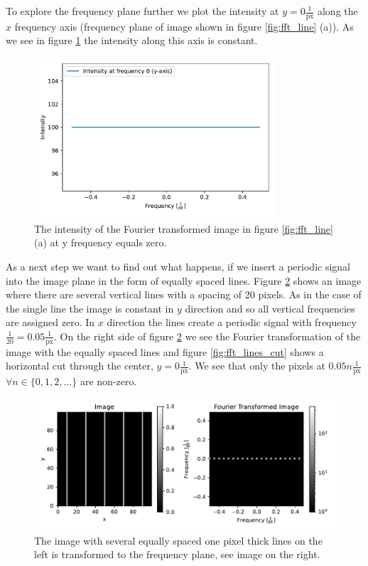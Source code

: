 To explore the frequency plane further we plot the intensity at $y=0 \frac{1}{\mathrm{px}}$ along the $x$ frequency axis (frequency plane of image shown in figure \ref{fig:fft_line} (a)). As we see in figure \ref{fig:fft_line_cut} the intensity along this axis is constant.
\begin{figure}[H]
	\centering
		\includegraphics[width=0.8\textwidth]{pics/fft_simulation_cutoneline.pdf}
		\caption{The intensity of the Fourier transformed image in figure \ref{fig:fft_line} (a) at y frequency equals zero.}
		\label{fig:fft_line_cut}
\end{figure}
As a next step we want to find out what happens, if we insert a periodic signal into the image plane in the form of equally spaced lines. Figure \ref{fig:fft_lines} shows an image where there are several vertical lines with a spacing of 20 pixels. As in the case of the single line the image is constant in $y$ direction and so all vertical frequencies are assigned zero. In $x$ direction the lines create a periodic signal with frequency $\frac{1}{20} = 0.05 \frac{1}{\mathrm{px}}$. On the right side of figure \ref{fig:fft_lines} we see the Fourier transformation of the image with the equally spaced lines and figure \ref{fig:fft_lines_cut} shows a horizontal cut through the center, $y=0 \frac{1}{\mathrm{px}}$. We see that only the pixels at $0.05n \frac{1}{\mathrm{px}}$ $\forall n \in \{0, 1, 2, ...\}$ are non-zero.
\begin{figure}[H]
	\centering
		\includegraphics[width=1.0\textwidth]{pics/fft_simulationmorelines.pdf}
		\caption{The image with several equally spaced one pixel thick lines on the left is transformed to the frequency plane, see image on the right.}
		\label{fig:fft_lines}
\end{figure}
